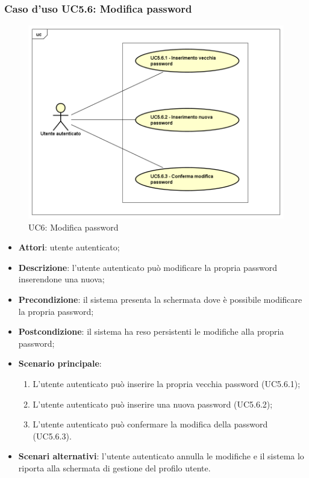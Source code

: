 \subsubsection{Caso d'uso UC5.6: Modifica password}
\label{UC5.6}
\begin{figure}[h]
	\centering
	\includegraphics[scale=0.5,keepaspectratio]{UML/UC5_6.png}
	\caption{UC6: Modifica password}
\end{figure}

\begin{itemize}
	\item \textbf{Attori}: utente autenticato;
	\item \textbf{Descrizione}: l'utente autenticato può modificare la propria password inserendone una nuova;
	\item \textbf{Precondizione}: il sistema presenta la schermata dove è possibile modificare la propria password;
	\item \textbf{Postcondizione}: il sistema ha reso persistenti le modifiche alla propria password;
	\item \textbf{Scenario principale}:
	\begin{enumerate}
		\item L'utente autenticato può inserire la propria vecchia password (UC5.6.1);
		\item L'utente autenticato può inserire una nuova password (UC5.6.2);
		\item L'utente autenticato può confermare la modifica della password (UC5.6.3).
	\end{enumerate}
	\item \textbf{Scenari alternativi}: l'utente autenticato annulla le modifiche e il sistema lo riporta alla schermata di gestione del profilo utente.
\end{itemize}

